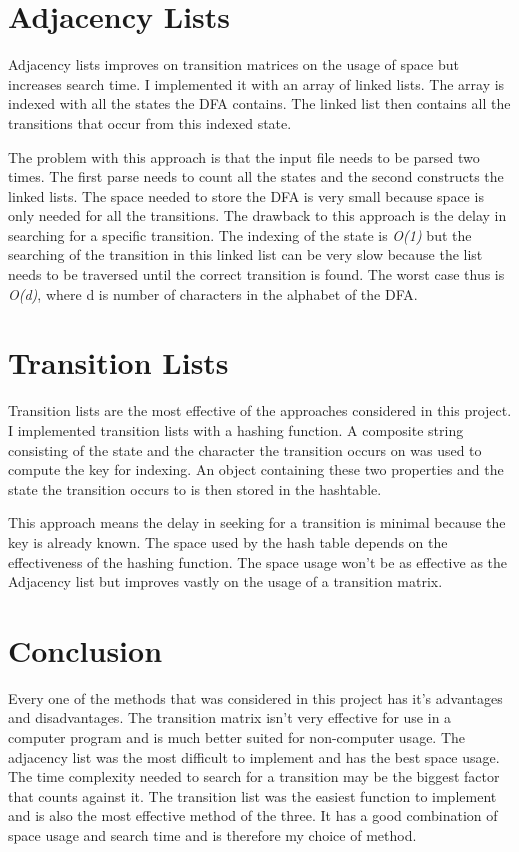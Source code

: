\documentclass[a4paper,11pt,titlepage]{article}
\begin{document}
\section{Adjacency Lists}
Adjacency lists improves on transition matrices on the usage of space but increases search time. I implemented it with an array of linked lists. The array is indexed with all the states the DFA contains. The linked list then contains all the transitions that occur from this indexed state.

The problem with this approach is that the input file needs to be parsed two times. The first parse needs to count all the states and the second constructs the linked lists. The space needed to store the DFA is very small because space is only needed for all the transitions. The drawback to this approach is the delay in searching for a specific transition. The indexing of the state is \textit{O(1)} but the searching of the transition in this linked list can be very slow because the list needs to be traversed until the correct transition is found. The worst case thus is \textit{O(d)}, where d is number of characters in the alphabet of the DFA.
\pagebreak
\section{Transition Lists}
Transition lists are the most effective of the approaches considered in this project. I implemented transition lists with a hashing function. A composite string consisting of the state and the character the transition occurs on was used to compute the key for indexing. An object containing these two properties and the state the transition occurs to is then stored in the hashtable.

This approach means the delay in seeking for a transition is minimal because the key is already known. The space used by the hash table depends on the effectiveness of the hashing function. The space usage won't be as effective as the Adjacency list but improves vastly on the usage of a transition matrix.
\pagebreak
\section{Conclusion}
Every one of the methods that was considered in this project has it's advantages and disadvantages. The transition matrix isn't very effective for use in a computer program and is much better suited for non-computer usage. The adjacency list was the most difficult to implement and has the best space usage. The time complexity needed to search for a transition may be the biggest factor that counts against it. The transition list was the easiest function to implement and is also the most effective method of the three. It has a good combination of space usage and search time and is therefore my choice of method.
\end{document}
